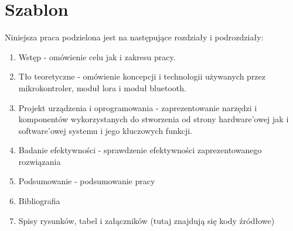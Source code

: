 \section{Szablon}
Niniejsza praca podzielona jest na następujące rozdziały i podrozdziały:
\begin{enumerate}
	\item Wstęp - omówienie celu jak i zakresu pracy.
	\item Tło teoretyczne - omówienie koncepcji i technologii używanych przez mikrokontroler, moduł lora i moduł bluetooth.
	\item Projekt urządzenia i oprogramowania - zaprezentowanie narzędzi i komponentów wykorzystanych do stworzenia od strony hardware'owej jak i software'owej systemu i jego kluczowych funkcji.
	\item Badanie efektywności - sprawdzenie efektywności zaprezentowanego rozwiązania
	\item Podsumowanie - podsumowanie pracy
	\item Bibliografia
	\item Spisy rysunków, tabel i załączników (tutaj znajdują się kody źródłowe)
\end{enumerate}